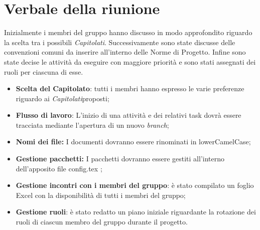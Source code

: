 \section{Verbale della riunione}
		 Inizialmente i membri del gruppo hanno discusso in modo approfondito riguardo la scelta tra i possibili \textit{Capitolati\glos}. Successivamente sono state discusse delle convenzioni comuni da inserire all'interno delle Norme di Progetto. Infine sono state decise le attività da eseguire con maggiore priorità e sono stati assegnati dei ruoli per ciascuna di esse.
	\begin{itemize}
		\item \textbf {Scelta del Capitolato\glos}: tutti i membri hanno espresso le varie preferenze riguardo ai \textit{Capitolati}\glo proposti;
		\item \textbf {Flusso di lavoro}: L'inizio di una attività e dei relativi task dovrà essere tracciata mediante l'apertura di un nuovo \textit{branch\glo};
		\item \textbf{Nomi dei file:} I documenti dovranno essere rinominati in lowerCamelCase;
		\item \textbf{Gestione pacchetti:} I pacchetti dovranno essere gestiti all'interno dell'apposito file config.tex ;
		\item \textbf {Gestione incontri con i membri del gruppo}: è stato compilato un foglio Excel con la disponibilità di tutti i membri del gruppo;
		\item \textbf {Gestione ruoli}: è stato redatto un piano iniziale riguardante la rotazione dei ruoli di ciascun membro del gruppo durante il progetto.
	\end{itemize}

